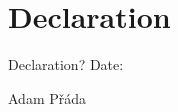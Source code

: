 \chapter*{Declaration}
\justify
Declaration?
\vspace{2cm}
\flushleft
Date:
\vspace{1cm}

\hspace{10.15cm}Adam P\v r\' ada